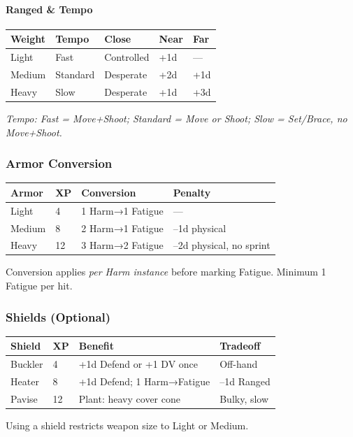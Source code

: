 \paragraph{Ranged \& Tempo}
\begin{center}
\begin{tabular}{lllll}
\toprule
Weight & Tempo & Close & Near & Far \\
\midrule
Light  & Fast   & Controlled & +1d & --- \\
Medium & Standard & Desperate & +2d & +1d \\
Heavy  & Slow    & Desperate & +1d & +3d \\
\bottomrule
\end{tabular}
\end{center}
\textit{Tempo: Fast = Move+Shoot; Standard = Move or Shoot; Slow = Set/Brace, no Move+Shoot.}

\subsubsection{Armor Conversion}
\begin{center}
\begin{tabular}{llll}
\toprule
Armor & XP & Conversion & Penalty \\
\midrule
Light  & 4  & 1 Harm→1 Fatigue & --- \\
Medium & 8  & 2 Harm→1 Fatigue & –1d physical \\
Heavy  & 12 & 3 Harm→2 Fatigue & –2d physical, no sprint \\
\bottomrule
\end{tabular}
\end{center}
Conversion applies \textit{per Harm instance} before marking Fatigue. Minimum 1 Fatigue per hit.

\subsubsection{Shields (Optional)}
\begin{center}
\begin{tabular}{llll}
\toprule
Shield & XP & Benefit & Tradeoff \\
\midrule
Buckler & 4 & +1d Defend or +1 DV once & Off-hand \\
Heater  & 8 & +1d Defend; 1 Harm→Fatigue & –1d Ranged \\
Pavise  & 12 & Plant: heavy cover cone & Bulky, slow \\
\bottomrule
\end{tabular}
\end{center}
Using a shield restricts weapon size to Light or Medium.

